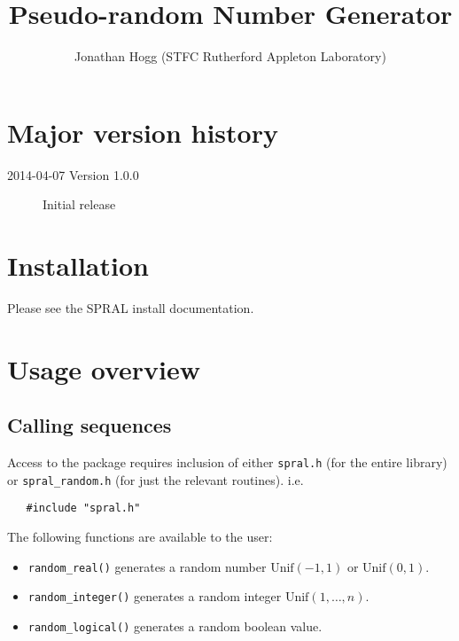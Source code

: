 
\title{Pseudo-random Number Generator}
\author{
   Jonathan Hogg (STFC Rutherford Appleton Laboratory) \\
}
\spralmaketitle
\thispagestyle{firststyle}

\section*{Major version history}
\begin{description}
\item[2014-04-07 Version 1.0.0] Initial release
\end{description}


\section{Installation}
Please see the SPRAL install documentation.


\section{Usage overview}

\subsection{Calling sequences}

Access to the package requires inclusion of either \texttt{spral.h} (for the
entire \spral library) or \texttt{spral\_random.h} (for just the relevant routines). i.e.

\begin{verbatim}
   #include "spral.h"
\end{verbatim}

\noindent
The following functions are available to the user:
\begin{itemize}
\item {\tt random\_real()} generates a random number $\mathrm{Unif}(-1,1)$ or
   $\mathrm{Unif}(0,1)$.
\item {\tt random\_integer()} generates a random integer $\mathrm{Unif}(1,\ldots,n)$.
\item {\tt random\_logical()} generates a random boolean value.
\end{itemize}

